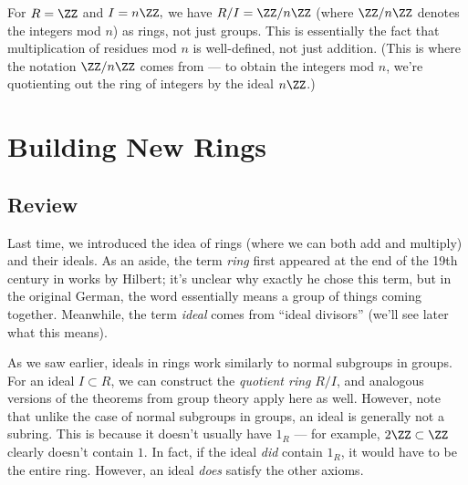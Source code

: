 
\begin{example}
For $R = \ZZ$ and $I = n\ZZ,$ we have $R/I = \ZZ/n\ZZ$ (where $\ZZ/n\ZZ$ denotes the integers mod $n$) as rings, not just groups. This is essentially the fact that multiplication of residues mod $n$ is well-defined, not just addition. (This is where the notation $\ZZ/n\ZZ$ comes from --- to obtain the integers mod $n$, we're quotienting out the ring of integers by the ideal $n\ZZ$.) 
\end{example}



\section{Building New Rings}

\subsection{Review}

Last time, we introduced the idea of rings (where we can both add and multiply) and their ideals. As an aside, the term \emph{ring} first appeared at the end of the 19th century in works by Hilbert; it's unclear why exactly he chose this term, but in the original German, the word essentially means a group of things coming together. Meanwhile, the term \emph{ideal} comes from ``ideal divisors'' (we'll see later what this means). 

As we saw earlier, ideals in rings work similarly to normal subgroups in groups. For an ideal $I \subset R$, we can construct the \emph{quotient ring} $R/I$, and analogous versions of the theorems from group theory apply here as well. However, note that unlike the case of normal subgroups in groups, an ideal is generally not a subring. This is because it doesn't usually have $1_R$ --- for example, $2\ZZ \subset \ZZ$ clearly doesn't contain $1$. In fact, if the ideal \emph{did} contain $1_R$, it would have to be the entire ring. However, an ideal \emph{does} satisfy the other axioms. 

